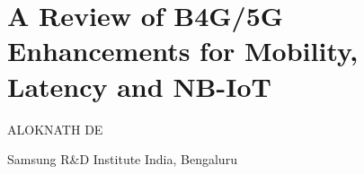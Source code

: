 \chapter{A Review of B4G/5G Enhancements for Mobility, Latency and NB-I\lowercase{o}T}

\begin{center}
{\large\uppercase{Aloknath De}} 

Samsung R\&D Institute India, Bengaluru

\vskip -6pt

\end{center}

\vskip 2cm




\vfill




\newpage

